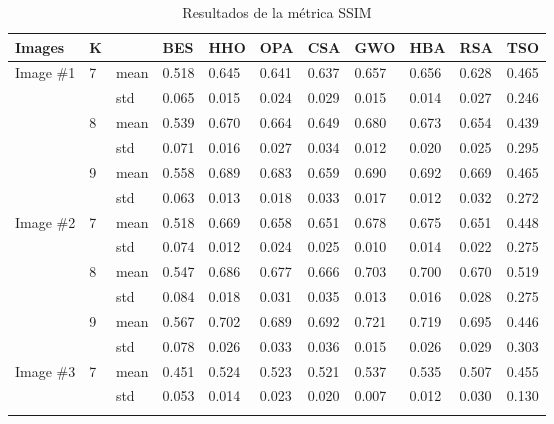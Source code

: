 \documentclass[conference]{IEEEtran}
\begin{document}
\begin{table*}
\centering
\caption{Resultados de la métrica SSIM}
\begin{tabularx}{\textwidth}{|X|X|X|X|X|X|X|X|X|X|X|}
\hline
       Images           &        K           &  & BES & HHO & OPA & CSA & GWO & HBA & RSA & TSO \\ \hline
\multirow{6}{*}{Image \#1} & \multirow{2}{*}{7} & mean  & 0.518 & 0.645 & 0.641 & 0.637 & 0.657 & 0.656 & 0.628 & 0.465 \\ \cline{3-11} 
                  &                   & std & 0.065 & 0.015 & 0.024 & 0.029 & 0.015 & 0.014 & 0.027 & 0.246 \\ \cline{2-11} 
                  & \multirow{2}{*}{8} & mean & 0.539 & 0.670 & 0.664 & 0.649 & 0.680 & 0.673 & 0.654 & 0.439 \\ \cline{3-11} 
                  &                   & std & 0.071 & 0.016 & 0.027 & 0.034 & 0.012 & 0.020 & 0.025 & 0.295 \\ \cline{2-11} 
                  & \multirow{2}{*}{9} & mean & 0.558 & 0.689 & 0.683 & 0.659 & 0.690 & 0.692 & 0.669 & 0.465 \\ \cline{3-11} 
                  &                   & std & 0.063 & 0.013 & 0.018 & 0.033 & 0.017 & 0.012 & 0.032 & 0.272 \\ \hline
\multirow{6}{*}{Image \#2} & \multirow{2}{*}{7} & mean & 0.518 & 0.669 & 0.658 & 0.651 & 0.678 & 0.675 & 0.651 & 0.448 \\ \cline{3-11} 
                  &                   & std & 0.074 & 0.012 & 0.024 & 0.025 & 0.010 & 0.014 & 0.022 & 0.275 \\ \cline{2-11} 
                  & \multirow{2}{*}{8} & mean & 0.547 & 0.686 & 0.677 & 0.666 & 0.703 & 0.700 & 0.670 & 0.519 \\ \cline{3-11} 
                  &                   & std & 0.084 & 0.018 & 0.031 & 0.035 & 0.013 & 0.016 & 0.028 & 0.275 \\ \cline{2-11} 
                  & \multirow{2}{*}{9} & mean & 0.567 & 0.702 & 0.689 & 0.692 & 0.721 & 0.719 & 0.695 & 0.446 \\ \cline{3-11} 
                  &                   & std & 0.078 & 0.026 & 0.033 & 0.036 & 0.015 & 0.026 & 0.029 & 0.303 \\ \hline
\multirow{6}{*}{Image \#3} & \multirow{2}{*}{7} & mean & 0.451 & 0.524 & 0.523 & 0.521 & 0.537 & 0.535 & 0.507 & 0.455 \\ \cline{3-11} 
                  &                   & std & 0.053 & 0.014 & 0.023 & 0.020 & 0.007 & 0.012 & 0.030 &  0.130  \\ \cline{2-11} 

\end{tabularx}
\end{table*}
\end{document}
